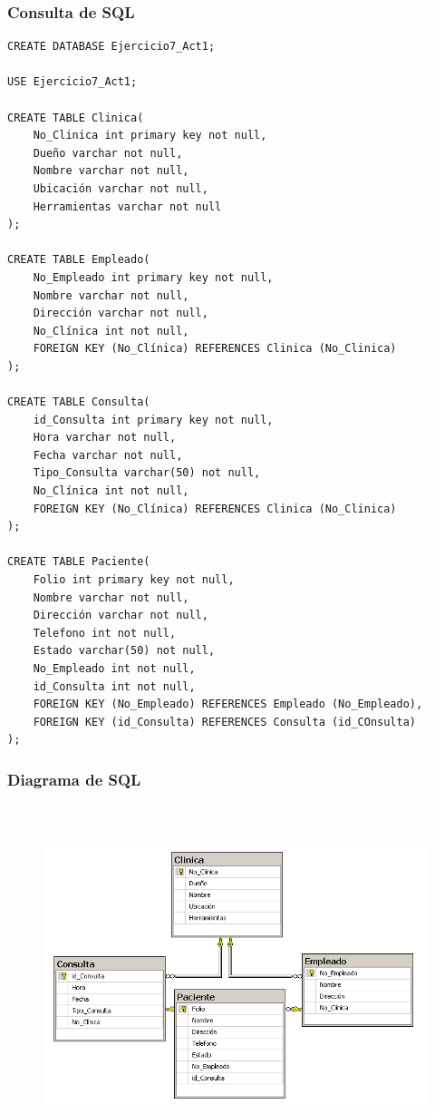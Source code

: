 \documentclass[a4paper, 12pt]{article}
\begin{document}
\begin{justify}
        \subsubsection{Consulta de SQL}
\begin{verbatim}
CREATE DATABASE Ejercicio7_Act1;

USE Ejercicio7_Act1;

CREATE TABLE Clinica(
    No_Clinica int primary key not null,
    Dueño varchar not null,
    Nombre varchar not null,
    Ubicación varchar not null,
    Herramientas varchar not null
);

CREATE TABLE Empleado(
    No_Empleado int primary key not null,
    Nombre varchar not null,
    Dirección varchar not null,
    No_Clínica int not null,
    FOREIGN KEY (No_Clínica) REFERENCES Clinica (No_Clinica)
);

CREATE TABLE Consulta(
    id_Consulta int primary key not null,
    Hora varchar not null,
    Fecha varchar not null,
    Tipo_Consulta varchar(50) not null,
    No_Clínica int not null,
    FOREIGN KEY (No_Clínica) REFERENCES Clinica (No_Clinica)
);

CREATE TABLE Paciente(
    Folio int primary key not null,
    Nombre varchar not null,
    Dirección varchar not null,
    Telefono int not null,
    Estado varchar(50) not null,
    No_Empleado int not null,
    id_Consulta int not null,
    FOREIGN KEY (No_Empleado) REFERENCES Empleado (No_Empleado),
    FOREIGN KEY (id_Consulta) REFERENCES Consulta (id_COnsulta)
);
\end{verbatim}
        \subsubsection{Diagrama de SQL}
        \begin{figure}[H]
            \centering
            \includegraphics[width=12cm,height=10cm]{sql7.PNG}
        \end{figure}

\end{justify}
\end{document}
